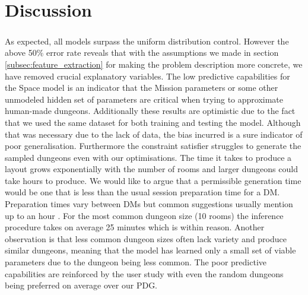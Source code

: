 \documentclass{UoYCSproject}
\begin{document}
\chapter{Discussion}
\paragraph{}
As expected, all models surpass the uniform distribution control. However the above 50\% error rate reveals that with the assumptions we made in section \ref{subsec:feature_extraction} for making the problem description more concrete, we have removed crucial explanatory variables. The low predictive capabilities for the Space model is an indicator that the Mission parameters or some other unmodeled hidden set of parameters are critical when trying to approximate human-made dungeons. Additionally these results are optimistic due to the fact that we used the same dataset for both training and testing the model. Although that was necessary due to the lack of data, the bias incurred is a sure indicator of poor generalisation. Furthermore the constraint satisfier struggles to generate the sampled dungeons even with our optimisations. The time it takes to produce a layout grows exponentially with the number of rooms and larger dungeons could take hours to produce. We would like to argue that a permissible generation time would be one that is less than the usual session preparation time for a DM. Preparation times vary between DMs but common suggestions usually mention up to an hour \parencite{SessionPrepTime}. For the most common dungeon size (10 rooms) the inference procedure takes on average 25 minutes which is within reason. Another observation is that less common dungeon sizes often lack variety and produce similar dungeons, meaning that the model has learned only a small set of viable parameters due to the dungeon being less common.
The poor predictive capabilities are reinforced by the user study with even the random dungeons being preferred on average over our PDG.
\end{document}
